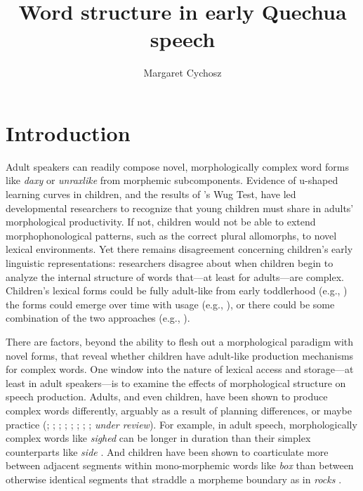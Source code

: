 \documentclass[a4paper,man,floatsintext,natbib,donotrepeattitle, apacite]{apa6}
\title{\LARGE Word structure in early Quechua speech}
\author[a]{\large Margaret Cychosz}
\affil[a]{\small University of California, Berkeley, Department of Linguistics, 1203 Dwinelle Hall, Berkeley, USA, \url{mcychosz@berkeley.edu}}
\affiliation{} %
\begin{document}
\justifying
\setlength\parindent{24pt} %

\maketitle

\setcounter{secnumdepth}{2} %


\section{Introduction}

Adult speakers can readily compose novel, morphologically complex word forms like \textit{daxy} or \textit{unraxlike} from morphemic subcomponents. Evidence of u-shaped learning curves in children, and the results of \citet{berkoChildLearningEnglish1958}'s Wug Test, have led developmental researchers to recognize that young children must share in adults' morphological productivity. If not, children would not be able to extend morphophonological patterns, such as the correct plural allomorphs, to novel lexical environments. Yet there remains disagreement concerning children’s early linguistic representations: researchers disagree about when children begin to analyze the internal structure of words that---at least for adults---are complex. Children's lexical forms could be fully adult-like from early toddlerhood (e.g., \citealt{wexlerVeryEarlyParameter1998}) the forms could emerge over time with usage (e.g., \citealt{ambridgeUbiquityFrequencyEffects2015}), or there could be some combination of the two approaches (e.g., \citealt{swingleyLexicalNeighborhoodsWordForm2002}). 

There are factors, beyond the ability to flesh out a morphological paradigm with novel forms, that reveal whether children have adult-like production mechanisms for complex words. One window into the nature of lexical access and storage---at least in adult speakers---is to examine the effects of morphological structure on speech production. Adults, and even children, have been shown to produce complex words differently, arguably as a result of planning differences, or maybe practice (\citealt{choEffectsMorphemeBoundaries2001}; \citealt{hayCausesConsequencesWord2003}; \citealt{lee-kimMorphologicalEffectsDarkness2013}; \citealt{plagPhonologicalPhoneticVariability2014}; \citealt{songDurationalCuesFricative2013}; \citealt{songEffectsCoarticulationMorphological2013};  \citealt{strycharczukPhoneticDetailPhonetic2019}; \citealt{sugaharaDurationalCorrelatesEnglish2009}; 
\citeauthor{tomaschekHowAnticipatoryCoarticulation2019} \textit{under review}). For example, in adult speech, morphologically complex words like \textit{sighed} can be longer in duration than their simplex counterparts like \textit{side} \citep{sugaharaDurationalCorrelatesEnglish2009}. And children have been shown to coarticulate more between adjacent segments within mono-morphemic words like \textit{box} than between otherwise identical segments that straddle a morpheme boundary as in \textit{rocks} \citep{songEffectsCoarticulationMorphological2013}. 
\end{document}
